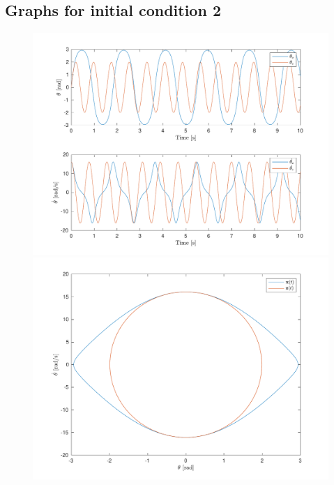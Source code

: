 \documentclass[10pt]{article}
\begin{document}
\subsection{Graphs for initial condition 2}
\begin{figure}[ht]
    \centering
    \begin{minipage}[b]{0.45\textwidth}
        \centering
        \includegraphics[width=1\linewidth]{lab1/figs/section5_X0_2_state_evolution.pdf}
    \end{minipage}
    \begin{minipage}[b]{0.45\textwidth}
        \centering
        \includegraphics[width=1\linewidth]{lab1/figs/section5_X0_2_state_orbit.pdf}
    \end{minipage}
    
    \label{figure:x_0_2_state_evolution}
\end{figure}
\end{document}
